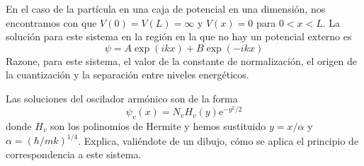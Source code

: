 \documentclass[addpoints,spanish, 12pt,a4paper]{exam}
\begin{document}
\begin{questions}
    \question[2] En el caso de la partícula en una
    caja de potencial en una dimensión, nos encontramos
    con que $V(0)=V(L)=\infty$ y $V(x)=0$ para 
    $0<x<L$. La solución para este sistema en 
    la región en la que no hay un potencial externo es
    \begin{equation*}
        \psi=A\exp(ikx) + B\exp(-ikx) 
    \end{equation*}
    Razone, para este sistema, el valor de la constante
    de normalización, el origen de la cuantización y la
    separación entre niveles energéticos.
    \newpage%
    
    \question[1\half] Las soluciones del oscilador armónico
    son de la forma
    \begin{equation*}
        \psi_v(x) = N_vH_v(y)\mathrm{e}^{-y^2/2}    
    \end{equation*}
    donde $H_v$ son los polinomios de Hermite y 
    hemos sustituido $y=x/\alpha$ y 
    $\alpha=(\hbar/mk)^{1/4}$. Explica, valiéndote de un
    dibujo, cómo se aplica el principio de correspondencia
    a este sistema.
    \newpage
    

\end{questions}
\end{document}
